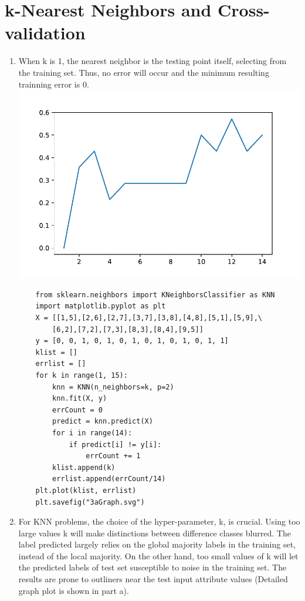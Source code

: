 \documentclass[11pt]{article}
\begin{document}
\section{k-Nearest Neighbors and Cross-validation}
\begin{enumerate}[label=(\alph*)]
    \item
        When k is 1, the nearest neighbor is the testing point itself, selecting from the training set. Thus, no error will occur and the minimum resulting trainning error is 0.\\
    \includegraphics{3aGraph.pdf}
    \begin{verbatim}
    from sklearn.neighbors import KNeighborsClassifier as KNN
    import matplotlib.pyplot as plt
    X = [[1,5],[2,6],[2,7],[3,7],[3,8],[4,8],[5,1],[5,9],\
        [6,2],[7,2],[7,3],[8,3],[8,4],[9,5]]
    y = [0, 0, 1, 0, 1, 0, 1, 0, 1, 0, 1, 0, 1, 1]
    klist = []
    errlist = []
    for k in range(1, 15):
        knn = KNN(n_neighbors=k, p=2)
        knn.fit(X, y)
        errCount = 0
        predict = knn.predict(X)
        for i in range(14):
            if predict[i] != y[i]:
                errCount += 1
        klist.append(k)
        errlist.append(errCount/14)
    plt.plot(klist, errlist)
    plt.savefig("3aGraph.svg")
    \end{verbatim}

    \item
        For KNN problems, the choice of the hyper-parameter, k, is crucial. Using too large values k will make distinctions between difference classes blurred. The label predicted largely relies on the global majority labels in the training set, instead of the local majority. On the other hand, too small values of k will let the predicted labels of test set susceptible to noise in the training set. The results are prone to outliners near the test input attribute values (Detailed graph plot is shown in part a).


\end{enumerate}
\end{document}
